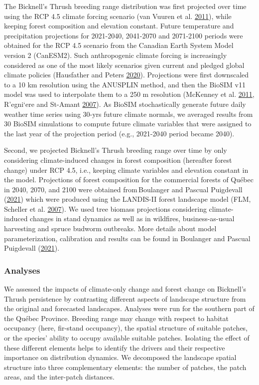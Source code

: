 \documentclass[12pt]{article}
\begin{document}
The Bicknell's Thrush breeding range distribution was first projected
over time using the RCP 4.5 climate forcing scenario (van Vuuren et al.
\protect\hyperlink{ref-van_vuuren_representative_2011}{2011}), while
keeping forest composition and elevation constant. Future temperature
and precipitation projections for 2021-2040, 2041-2070 and 2071-2100
periods were obtained for the RCP 4.5 scenario from the Canadian Earth
System Model version 2 (CanESM2). Such anthropogenic climate forcing is
increasingly considered as one of the most likely scenarios given
current and pledged global climate policies (Hausfather and Peters
\protect\hyperlink{ref-hausfather_emissions_2020}{2020}). Projections
were first downscaled to a 10 km resolution using the ANUSPLIN method,
and then the BioSIM v11 model was used to interpolate them to a 250 m
resolution (McKenney et al.
\protect\hyperlink{ref-mckenney_customized_2011}{2011}, R\a'egni\a`ere
and St-Amant \protect\hyperlink{ref-regniere_stochastic_2007}{2007}). As
BioSIM stochastically generate future daily weather time series using
30-yrs future climate normals, we averaged results from 30 BioSIM
simulations to compute future climate variables that were assigned to
the last year of the projection period (e.g., 2021-2040 period became
2040).

Second, we projected Bicknell's Thrush breeding range over time by only
considering climate-induced changes in forest composition (hereafter
forest change) under RCP 4.5, i.e., keeping climate variables and
elevation constant in the model. Projections of forest composition for
the commercial forests of Québec in 2040, 2070, and 2100 were obtained
from\,Boulanger and Pascual Puigdevall
(\protect\hyperlink{ref-boulanger_boreal_2021}{2021}) which were
produced using the LANDIS-II forest landscape model (FLM, Scheller et
al. \protect\hyperlink{ref-scheller_design_2007}{2007}). We used tree
biomass projections considering climate-induced changes in stand
dynamics as well as in wildfires, business-as-usual harvesting and
spruce budworm outbreaks. More details about model parameterization,
calibration and results can be found in Boulanger and Pascual Puigdevall
(\protect\hyperlink{ref-boulanger_boreal_2021}{2021}).

\hypertarget{analyses}{%
\subsubsection{Analyses}\label{analyses}}

We assessed the impacts of climate-only change and forest change on
Bicknell's Thrush persistence by contrasting different aspects of
landscape structure from the original and forecasted landscapes.
Analyses were run for the southern part of the Québec Province. Breeding
range may change with respect to habitat occupancy (here, fir-stand
occupancy), the spatial structure of suitable patches, or the species'
ability to occupy available suitable patches. Isolating the effect of
these different elements helps to identify the drivers and their
respective importance on distribution dynamics. We decomposed the
landscape spatial structure into three complementary elements: the
number of patches, the patch areas, and the inter-patch distances.
\end{document}
